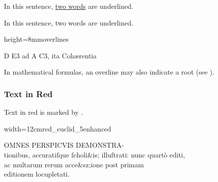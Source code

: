 
\vspace{3mm}
\begin{example}[ 1: \, underlines]

\vspace{-4mm}
In this sentence, \underline{two words} are underlined.

\vspace{-3mm}
\begin{typeLatin}
In this sentence, two words are underlined. \\
\end{typeLatin}
\end{example}

\begin{sampleImageSmall}[ 2: \, overlines]{height=8mm}{overlines}

\begin{typeLatin}
D E3 ad A C\lwr{}3, ita Cohærentia \\
\end{typeLatin}
\end{sampleImageSmall}

\begin{crossref}
In mathematical formulas, an overline may also indicate a root (see ).
\end{crossref}


\subsubsection{Text in Red}
\label{section text in red}

\begin{mainruleLessImportant}
Text in red is marked by .
\end{mainruleLessImportant}

\vspace{3mm}
\begin{sampleImageSmall}{width=12cm}{red_euclid_5enhanced}

\begin{typeLatin}
OMNES PERSPICVIS DEMONSTRA-  \\
tionibus, accuratiſque ſcholi&is; illuſtrati: nunc quartò editi,  \\
ac multarum rerum acce&sz;ione post primam  \\
editionem locupletati. \\
\end{typeLatin}
\end{sampleImageSmall}

